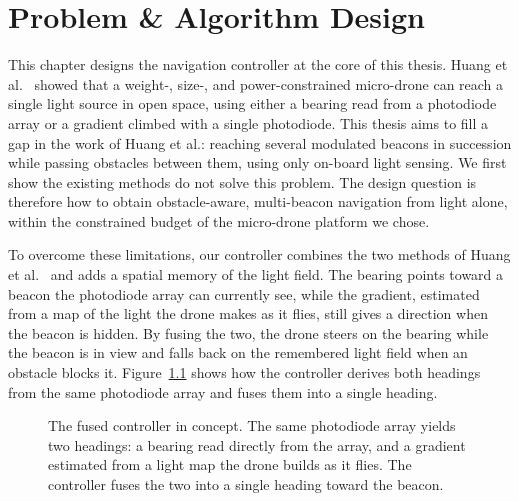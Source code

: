 \chapter{Problem \& Algorithm Design}
\label{chp:algorithm}

This chapter designs the navigation controller at the core of this thesis. Huang et al.~\cite{huang2026lta} showed that a weight-, size-, and power-constrained micro-drone can reach a single light source in open space, using either a bearing read from a photodiode array or a gradient climbed with a single photodiode. This thesis aims to fill a gap in the work of Huang et al.: reaching several modulated beacons in succession while passing obstacles between them, using only on-board light sensing. We first show the existing methods do not solve this problem. The design question is therefore how to obtain obstacle-aware, multi-beacon navigation from light alone, within the constrained budget of the micro-drone platform we chose.

To overcome these limitations, our controller combines the two methods of Huang et al.~\cite{huang2026lta} and adds a spatial memory of the light field. The bearing points toward a beacon the photodiode array can currently see, while the gradient, estimated from a map of the light the drone makes as it flies, still gives a direction when the beacon is hidden. By fusing the two, the drone steers on the bearing while the beacon is in view and falls back on the remembered light field when an obstacle blocks it. Figure~\ref{fig:fused-overview} shows how the controller derives both headings from the same photodiode array and fuses them into a single heading.

\begin{figure}[h]
    \centering
    \caption{The fused controller in concept. The same photodiode array yields two headings: a bearing read directly from the array, and a gradient estimated from a light map the drone builds as it flies. The controller fuses the two into a single heading toward the beacon.}
    \label{fig:fused-overview}
\end{figure}

